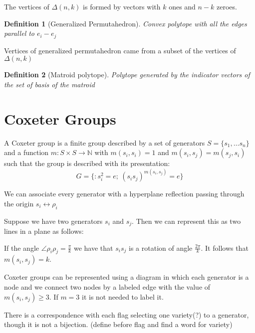 \documentclass{myclass}
\newtheorem*{definition}{Definition}
\begin{document}
The vertices of $\Delta(n,k)$ is formed by vectors with $k$ ones and  $n-k$ zeroes.

\begin{definition}[Generalized Permutahedron] Convex polytope with all the edges parallel to $e_i-e_j$
\end{definition}

Vertices of generalized permutahedron came from a subset of the vertices of $\Delta(n, k)$

 \begin{definition}[Matroid polytope] Polytope generated by the indicator vectors of the set of basis of the matroid
\end{definition}


\section{Coxeter Groups}
A Coxeter group is a finite group described by a set of generators $S=\{s_1, \ldots s_n\}$ and a function $m:S\times S \to \mathbb{N}$ with $m(s_i, s_i)=1$ and $m(s_i, s_j)=m(s_j, s_i)$ such that the group is described with its presentation:
 \[
G = \{ : s_i^2 = e; \  (s_is_j)^{m(s_i, s_j)}=e\}
\] 

We can associate every generator with a hyperplane reflection passing through the origin $s_i \leftrightarrow \rho_i$

Suppose we have two generators $s_i$ and  $s_j$. Then we can represent this as two lines in a plane as follows:

If the angle $\angle \rho_i \rho _j = \frac{\pi}{k}$ we have that $s_is_j$ is a rotation of angle $\frac{2\pi}{k}$. It follows that $m(s_i, s_j)=k$.

Coxeter groups can be represented using a diagram in which each generator is a node and we connect two nodes by a labeled edge with the value of $m(s_i, s_j)\ge 3$. If $m=3$ it is not needed to label it. 

\begin{center}
\end{center}

There is a correspondence with each flag selecting one variety(?) to a generator, though it is not a bijection. (define before flag and find a word for variety)
\end{document}
